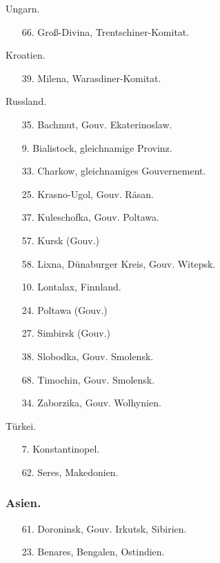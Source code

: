 \documentclass[a4paper, 11pt, oneside, polutonikogreek, german]{article}
\begin{document}
\begin{center}
Ungarn.
\end{center}
\begin{itemize}
    \small
    \item[66.] Groß-Divina, Trentschiner-Komitat.
\end{itemize}
\begin{center}
Kroatien.
\end{center}
\begin{itemize}
    \small
    \item[39.] Milena, Warasdiner-Komitat.
\end{itemize}
\begin{center}
Russland.
\end{center}
\begin{itemize}
    \small
    \item[35.] Bachmut, Gouv. Ekaterinoslaw.
    \item[9.] Bialistock, gleichnamige Provinz.
    \item[33.] Charkow, gleichnamiges Gouvernement.
    \item[25.] Krasno-Ugol, Gouv. Räsan.
    \item[37.] Kuleschofka, Gouv. Poltawa.
    \item[57.] Kursk (Gouv.)
    \item[58.] Lixna, Dünaburger Kreis, Gouv. Witepsk.
    \item[10.] Lontalax, Finnland.
    \item[24.] Poltawa (Gouv.)
    \item[27.] Simbirsk (Gouv.)
    \item[38.] Slobodka, Gouv. Smolensk.
    \item[68.] Timochin, Gouv. Smolensk.
    \item[34.] Zaborzika, Gouv. Wolhynien.
\end{itemize}
\begin{center}
Türkei.
\end{center}
\begin{itemize}
    \small
    \item[7.] Konstantinopel.
    \item[62.] Seres, Makedonien.
\end{itemize}
\subsubsection{Asien.}
\begin{itemize}
    \small
    \item[61.] Doroninsk, Gouv. Irkutsk, Sibirien.
    \item[23.] Benares, Bengalen, Ostindien.
\end{itemize}
\end{document}
